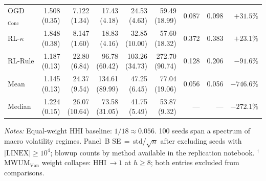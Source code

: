 \documentclass[a4paper,12pt]{article}
\begin{document}
\begin{table}[htbp]
\begin{tabular}{l rrrrr r r r}
OGD$_\text{Conc}$   & \makecell[r]{1.508\\\tiny(0.35)} & \makecell[r]{7.122\\\tiny(1.34)} & \makecell[r]{17.43\\\tiny(4.18)} & \makecell[r]{24.53\\\tiny(4.63)} & \makecell[r]{59.49\\\tiny(18.99)} & 0.087 & 0.098 & $+31.5\%$ \\
\cmidrule(lr){1-9}
RL-$\kappa$         & \makecell[r]{1.848\\\tiny(0.38)} & \makecell[r]{8.147\\\tiny(1.60)} & \makecell[r]{18.83\\\tiny(4.16)} & \makecell[r]{32.85\\\tiny(10.00)} & \makecell[r]{57.60\\\tiny(18.32)} & 0.372 & 0.383 & $+23.1\%$ \\
RL-Rule             & \makecell[r]{1.187\\\tiny(0.13)} & \makecell[r]{22.80\\\tiny(6.84)} & \makecell[r]{96.78\\\tiny(60.42)} & \makecell[r]{103.26\\\tiny(34.73)} & \makecell[r]{272.70\\\tiny(90.74)} & 0.128 & 0.206 & $-91.6\%$ \\
\cmidrule(lr){1-9}
Mean                & \makecell[r]{1.145\\\tiny(0.13)} & \makecell[r]{24.37\\\tiny(9.54)} & \makecell[r]{134.61\\\tiny(89.99)} & \makecell[r]{47.25\\\tiny(6.45)} & \makecell[r]{77.04\\\tiny(19.06)} & 0.056 & 0.056 & $-746.6\%$ \\
Median              & \makecell[r]{1.224\\\tiny(0.15)} & \makecell[r]{26.07\\\tiny(10.64)} & \makecell[r]{73.58\\\tiny(31.05)} & \makecell[r]{41.75\\\tiny(5.49)} & \makecell[r]{53.87\\\tiny(9.32)} & ---   & ---   & $-272.1\%$ \\
\bottomrule
\end{tabular}
\par\vspace{4pt}
\begin{minipage}{\linewidth}\scriptsize
\textit{Notes:}
Equal-weight HHI baseline: $1/18\approx0.056$.
100 seeds span a spectrum of macro volatility regimes.
Panel~B SE\,$=$\,std/$\sqrt{n}$ after excluding seeds with $|\text{LINEX}|\geq10^4$;
blowup counts by method available in the replication notebook.
$^\dagger$ MWUM$_\text{Van}$ weight collapse: HHI\,$\to 1$ at $h{\geq}8$;
  both entries excluded from comparisons.
\end{minipage}
\end{table}
\end{document}
